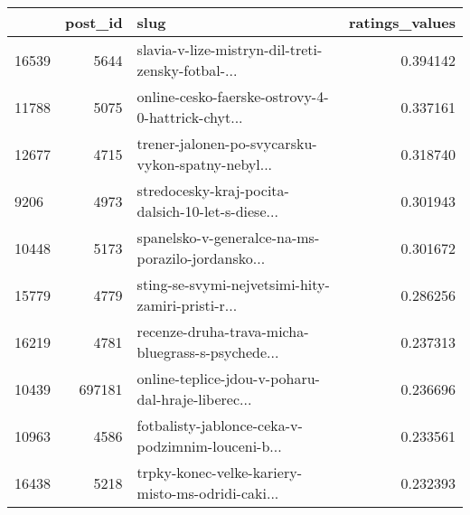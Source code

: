 \begin{tabular}{lrlr}
\toprule
{} &  post\_id &                                               slug &  ratings\_values \\
\midrule
16539 &     5644 &  slavia-v-lize-mistryn-dil-treti-zensky-fotbal-... &        0.394142 \\
11788 &     5075 &  online-cesko-faerske-ostrovy-4-0-hattrick-chyt... &        0.337161 \\
12677 &     4715 &  trener-jalonen-po-svycarsku-vykon-spatny-nebyl... &        0.318740 \\
9206  &     4973 &  stredocesky-kraj-pocita-dalsich-10-let-s-diese... &        0.301943 \\
10448 &     5173 &  spanelsko-v-generalce-na-ms-porazilo-jordansko... &        0.301672 \\
15779 &     4779 &  sting-se-svymi-nejvetsimi-hity-zamiri-pristi-r... &        0.286256 \\
16219 &     4781 &  recenze-druha-trava-micha-bluegrass-s-psychede... &        0.237313 \\
10439 &   697181 &  online-teplice-jdou-v-poharu-dal-hraje-liberec... &        0.236696 \\
10963 &     4586 &  fotbalisty-jablonce-ceka-v-podzimnim-louceni-b... &        0.233561 \\
16438 &     5218 &  trpky-konec-velke-kariery-misto-ms-odridi-caki... &        0.232393 \\
\bottomrule
\end{tabular}

